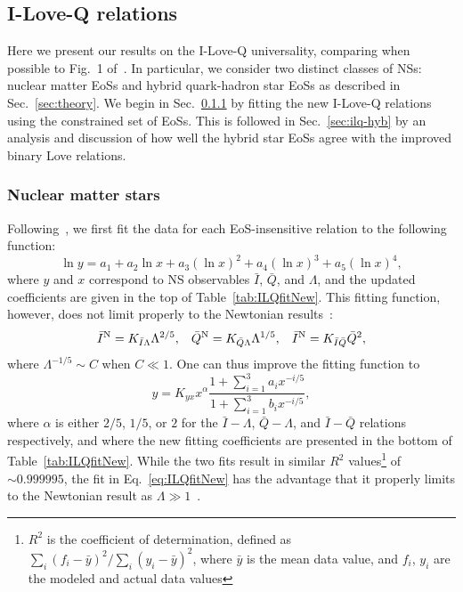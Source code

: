 \documentclass[prd,twocolumn,nofootinbib,superscriptaddress,amsmath,amssymb]{revtex4-1}
\begin{document}

\subsection{I-Love-Q relations}
\label{sec:ilq}

Here we present our results on the I-Love-Q universality, comparing when possible to Fig.~1 of~\cite{Yagi:ILQ}.
In particular, we consider two distinct classes of NSs: nuclear matter EoSs and hybrid quark-hadron star EoSs as described in Sec.~\ref{sec:theory}.
We begin in Sec.~\ref{sec:ilq-nuc} by fitting the new I-Love-Q relations using the constrained set of EoSs.
This is followed in Sec.~\ref{sec:ilq-hyb} by an analysis and discussion of how well the hybrid star EoSs agree with the improved binary Love relations. 

\subsubsection{Nuclear matter stars}
\label{sec:ilq-nuc}

Following~\cite{Yagi:ILQ}, we first fit the data for each EoS-insensitive relation to the following function:
\begin{equation}\label{eq:ILQfit}
\ln{y}=a_{1}+a_{2} \ln{x} + a_{3} (\ln{x})^2 + a_{4} (\ln{x})^3 + a_{5} (\ln{x})^4,
\end{equation}
where $y$ and $x$ correspond to NS observables $\bar{I}$, $\bar{Q}$, and $\Lambda$, and the updated coefficients are given in the top of Table~\ref{tab:ILQfitNew}. This fitting function, however, does not limit properly to the Newtonian results~\cite{Yagi:ILQ}:
\begin{equation}\label{eq:Newtonian}
\bar{I}^{\text{N}} = K_{\bar{I}\Lambda}\Lambda^{2/5}, \hspace{3mm} \bar{Q}^{\text{N}} = K_{\bar{Q}\Lambda}\Lambda^{1/5}, \hspace{3mm} \bar{I}^{\text{N}} = K_{\bar{I}\bar{Q}}\bar{Q}^{2},
\end{equation}
where $\Lambda^{-1/5} \sim C$ when $C \ll 1$. One can thus improve the fitting function to 
\begin{equation}\label{eq:ILQfitNew}
y=K_{yx} x^{\alpha} \frac{1+\sum_{i=1}^3 a_i x^{-i/5}}{1+\sum_{i=1}^3 b_i x^{-i/5}},
\end{equation}
where $\alpha$ is either $2/5$, $1/5$, or $2$ for the $\bar{I}-\Lambda$, $\bar{Q}-\Lambda$, and $\bar{I}-\bar{Q}$ relations respectively, and where the new fitting coefficients are presented in the bottom of Table~\ref{tab:ILQfitNew}. While the two fits result in similar $R^2$ values\footnote{$R^2$ is the coefficient of determination, defined as $\sum_i(f_i-\bar{y})^2/\sum_i(y_i-\bar{y})^2$, where $\bar{y}$ is the mean data value, and $f_i$, $y_i$ are the modeled and actual data values} of $\sim 0.999995$, the fit in Eq.~\eqref{eq:ILQfitNew} has the advantage that it properly limits to the Newtonian result as $\Lambda \gg 1$~\cite{Yagi:binLove}.
\end{document}
